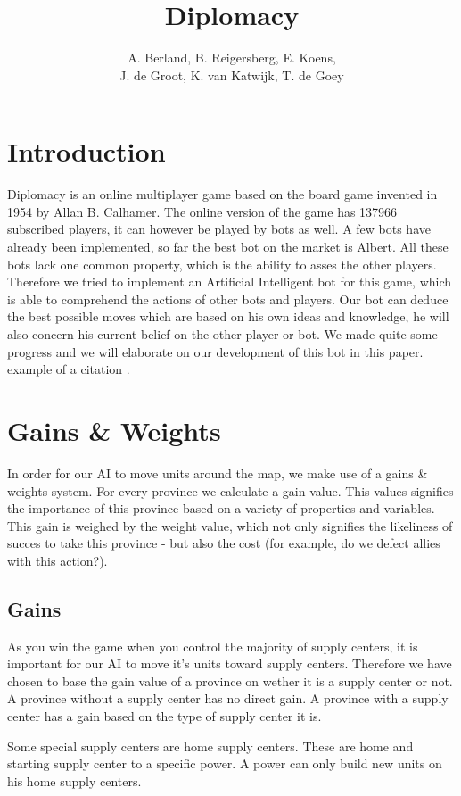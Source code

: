 \documentclass[a4paper]{article} %
\title{Diplomacy}
\author{A. Berland, B. Reigersberg, E. Koens, \\J. de Groot, K. van Katwijk, T. de Goey}
\begin{document}
\maketitle
\tableofcontents
\newpage

\section{Introduction}
Diplomacy is an online multiplayer game based on the board game invented in 1954 by Allan B. Calhamer. The online version of the game has 137966 subscribed players, it can however be played by bots as well. A few bots have already been implemented, so far the best bot on the market is Albert. All these bots lack one common property, which is the ability to asses the other players. Therefore we tried to implement an Artificial Intelligent bot for this game, which is able to comprehend the actions of other bots and players. Our bot can deduce the best possible moves which are based on his own ideas and knowledge, he will also concern his current belief on the other player or bot. We made quite some progress and we will elaborate on our development of this bot in this paper. example of a citation \cite{dipblue}. 

\section{Gains \& Weights}

In order for our AI to move units around the map, we make use of a gains \& weights system. For every province we calculate a gain value. This values signifies the importance of this province based on a variety of properties and variables. This gain is weighed by the weight value, which not only signifies the likeliness of succes to take this province - but also the cost (for example, do we defect allies with this action?).

\subsection{Gains}
As you win the game when you control the majority of supply centers, it is important for our AI to move it's units toward supply centers. Therefore we have chosen to base the gain value of a province on wether it is a supply center or not. A province without a supply center has no direct gain. A province with a supply center has a gain based on the type of supply center it is. 

Some special supply centers are home supply centers. These are home and starting supply center to a specific power. A power can only build new units on his home supply centers.   
\end{document}

